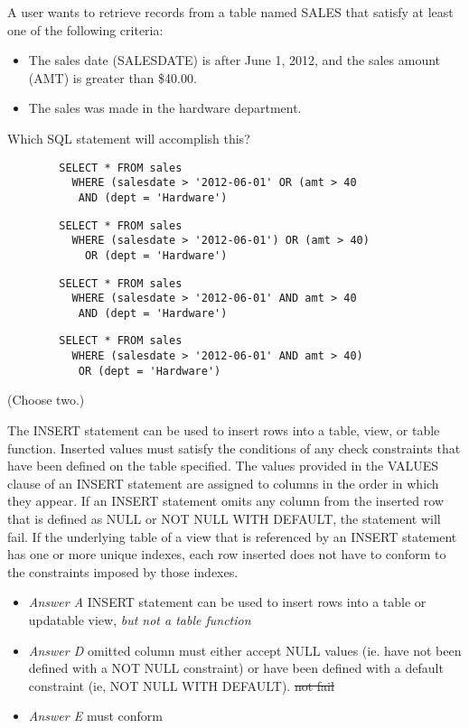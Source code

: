 \documentclass[answers, 11pt]{exam}
\begin{document}
\begin{questions}
\newpage
\question[1]
A user wants to retrieve records from a table named SALES that satisfy at least one of the following
criteria:
	\begin{itemize}
	\item The sales date (SALESDATE) is after June 1, 2012, and the sales amount (AMT) is greater
	than \$40.00.
	\item The sales was made in the hardware department. 
	\end{itemize}
Which SQL statement will accomplish this?
\begin{choices}
\choice \begin{verbatim}
		SELECT * FROM sales
		  WHERE (salesdate > '2012-06-01' OR (amt > 40
		   AND (dept = 'Hardware')
		\end{verbatim}
\choice \begin{verbatim}
		SELECT * FROM sales
		  WHERE (salesdate > '2012-06-01') OR (amt > 40)
		    OR (dept = 'Hardware')
		\end{verbatim}
\choice \begin{verbatim}
 		SELECT * FROM sales
 		  WHERE (salesdate > '2012-06-01' AND amt > 40
 		   AND (dept = 'Hardware')
		\end{verbatim}
\CorrectChoice \begin{verbatim}
		SELECT * FROM sales
		  WHERE (salesdate > '2012-06-01' AND amt > 40)
		   OR (dept = 'Hardware')
		\end{verbatim}
\end{choices}

 (Choose two.)
\begin{choices}
\choice The INSERT statement can be used to insert rows into a table, view, or table function.
\CorrectChoice Inserted values must satisfy the conditions of any check constraints that have been defined 
on the table specified.
\CorrectChoice The values provided in the VALUES clause of an INSERT statement are assigned to columns in 
the order in which they appear.
\choice If an INSERT statement omits any column from the inserted row that is defined as NULL or NOT
NULL WITH DEFAULT, the statement will fail.
\choice If the underlying table of a view that is referenced by an INSERT statement has one or more
unique indexes, each row inserted does not have to conform to the constraints imposed by those indexes.
\end{choices}

\begin{solution}
\begin{itemize}
\item \textit{Answer A} INSERT statement can be used to insert rows into a table or updatable view, 
\textit{but not a table function}
\item \textit{Answer D} omitted column must either accept NULL values (ie. have not been defined with 
a NOT NULL constraint) or have been defined with a default constraint (ie, NOT NULL WITH DEFAULT). \sout{not fail}
\item \textit{Answer E} must conform
\end{itemize}
\end{solution}


\end{questions}
\end{document}
